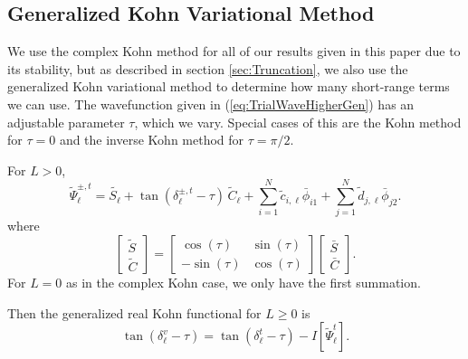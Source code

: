 \documentclass[preprint,showpacs,preprintnumbers,amsmath,amssymb]{revtex4}
\begin{document}
\subsection{Generalized Kohn Variational Method}
\label{sec:GenKohn}

We use the complex Kohn method for all of our results given in this paper due to its stability, but as described in section \ref{sec:Truncation}, we also use the generalized Kohn variational method \cite{Cooper2010} to determine how many short-range terms we can use. The wavefunction given in (\ref{eq:TrialWaveHigherGen}) has an adjustable parameter $\tau$, which we vary. Special cases of this are the Kohn method for $\tau = 0$ and the inverse Kohn method for $\tau = \pi/2$.

For $L > 0$,
\begin{equation}
\widetilde{\Psi}_\ell^{\pm,t} = \widetilde{S_\ell} + \tan(\delta^{\pm,t}_\ell - \tau) \, \widetilde{C}_\ell + \sum_{i=1}^N \widetilde{c}_{i,\ell} \bar{\phi}_{i1} + \sum_{j=1}^N \widetilde{d}_{j,\ell} \bar{\phi}_{j2}.
\label{eq:TrialWaveHigherGen}
\end{equation}
where
\begin{equation}
\begin{bmatrix}
\widetilde{S} \\
\widetilde{C}
\end{bmatrix}
=
\begin{bmatrix}
\cos(\tau) & \sin(\tau) \\
-\sin(\tau) & \cos(\tau)
\end{bmatrix}
\begin{bmatrix}
\bar{S} \\
\bar{C}
\end{bmatrix}.
\end{equation}
For $L = 0$ as in the complex Kohn case, we only have the first summation.

Then the generalized real Kohn functional for $L \geq 0$ is
\begin{equation}
\tan(\delta^{v}_\ell - \tau) = \tan(\delta^{t}_\ell - \tau) - I\left[\widetilde{\Psi}_\ell^{t}\right].
\label{eq:GenKohnVariation}
\end{equation}
\end{document}
